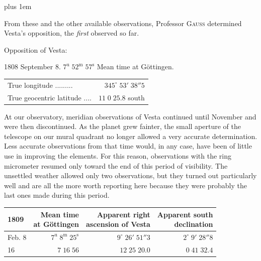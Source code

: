 {\rightskip=0pt plus 1em \par\indent From these and the other available observations, Professor \textsc{Gauss} determined Vesta’s opposition, the \emph{first} observed so far.\par}

\begin{center}Opposition of Vesta:

1808 September 8. $7^{\text{u}}\;52^{\text{m}}\;57^{\text{s}}$ Mean time at Göttingen.
\end{center}
\begin{center}\fontsize{10}{12}\selectfont\setlength{\tabcolsep}{5pt}\renewcommand{\arraystretch}{1.15}\begin{tabular}{lr}

True longitude .\;.\;.\;.\;.\;.\;.\;.\;.\; & $345^\circ\;53'\;38''5$\\
True geocentric latitude .\;.\;.\;.\; & $11\;0\;25.8$ south\\
\end{tabular}\end{center}


\par\indent At our observatory, meridian observations of Vesta continued until November and were then discontinued. As the planet grew fainter, the small aperture of the telescope on our mural quadrant no longer allowed a very accurate determination. Less accurate observations from that time would, in any case, have been of little use in improving the elements. For this reason, observations with the ring micrometer resumed only toward the end of this period of visibility. The unsettled weather allowed only two observations, but they turned out particularly well and are all the more worth reporting here because they were probably the last ones made during this period.


\begin{center}\fontsize{10}{12}\selectfont\setlength{\tabcolsep}{5pt}\renewcommand{\arraystretch}{1.15}\begin{tabular}{lrrr}
1809 & \shortstack{Mean time\\at Göttingen} & \shortstack{Apparent right\\ascension of Vesta} & \shortstack{Apparent south\\declination}\\
\hline
Feb. 8 & $7^{\text{u}}\;8^{\text{m}}\;25^{\text{s}}$ & $9^\circ\;26'\;51''3$ & $2^\circ\;9'\;28''8$\\
16 & $7\;16\;56$ & $12\;25\;20.0$ & $0\;41\;32.4$\\
\end{tabular}\end{center}


